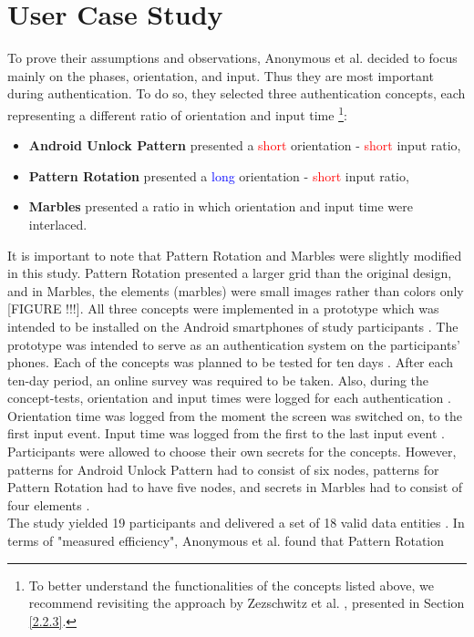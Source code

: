 \section{User Case Study}

To prove their assumptions and observations, Anonymous et al. \cite{anonymous} decided to focus mainly on the phases, orientation, and input. Thus they are most important during authentication. To do so, they selected three authentication concepts, each representing a different ratio of orientation and input time \cite{anonymous} \footnote{To better understand the functionalities of the concepts listed above, we recommend revisiting the approach by Zezschwitz et al. \cite{Marbles}, presented in Section \ref{2.2.3}.}: 

\begin{itemize}
    \item \textbf{Android Unlock Pattern} presented a \textcolor{red}{short} orientation - \textcolor{red}{short} input ratio,
    \item \textbf{Pattern Rotation} presented a \textcolor{blue}{long} orientation - \textcolor{red}{short} input ratio,
    \item \textbf{Marbles} presented a ratio in which orientation and input time were interlaced.
\end{itemize}

It is important to note that Pattern Rotation and Marbles were slightly modified in this study. Pattern Rotation presented a larger grid than the original design, and in Marbles, the elements (marbles) were small images rather than colors only [FIGURE !!!]. All three concepts were implemented in a prototype which was intended to be installed on the Android smartphones of study participants \cite{anonymous}. The prototype was intended to serve as an authentication system on the participants' phones. Each of the concepts was planned to be tested for ten days \cite{anonymous}. After each ten-day period, an online survey was required to be taken. Also, during the concept-tests, orientation and input times were logged for each authentication \cite{anonymous}. Orientation time was logged from the moment the screen was switched on, to the first input event. Input time was logged from the first to the last input event \cite{anonymous}. Participants were allowed to choose their own secrets for the concepts. However, patterns for Android Unlock Pattern had to consist of six nodes, patterns for Pattern Rotation had to have five nodes, and secrets in Marbles had to consist of four elements \cite{anonymous}. \\

The study yielded 19 participants and delivered a set of 18 valid data entities \cite{anonymous}. In terms of "measured efficiency", Anonymous et al. found that Pattern Rotation
